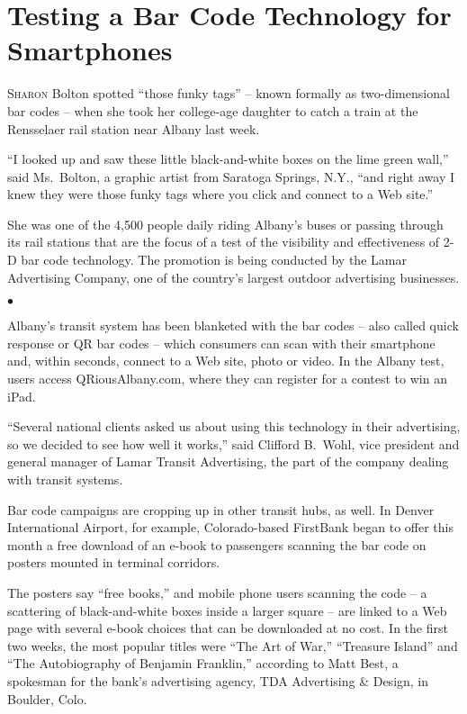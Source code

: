 ﻿\documentclass[12pt]{article}
\begin{document}
\section{Testing a Bar Code Technology for Smartphones}

\lettrine{S}{haron} Bolton spotted ``those funky tags'' -- known formally as
two-dimensional bar codes -- when she took her college-age daughter to catch a train at the
Rensselaer rail station near Albany last week.

``I looked up and saw these little black-and-white boxes on the lime green wall,'' said Ms.~Bolton,
a graphic artist from Saratoga Springs, N.Y., ``and right away I knew they were those funky tags
where you click and connect to a Web site.''

She was one of the 4,500 people daily riding Albany's buses or passing through its rail stations
that are the focus of a test of the visibility and effectiveness of 2-D bar code technology. The
promotion is being conducted by the Lamar Advertising Company, one of the country's largest outdoor
advertising businesses.

$\bullet$

Albany's transit system has been blanketed with the bar codes -- also called quick response or QR
bar codes -- which consumers can scan with their smartphone and, within seconds, connect to a Web
site, photo or video. In the Albany test, users access QRiousAlbany.com, where they can register for
a contest to win an iPad.

``Several national clients asked us about using this technology in their advertising, so we decided
to see how well it works,'' said Clifford B.~Wohl, vice president and general manager of Lamar
Transit Advertising, the part of the company dealing with transit systems.

Bar code campaigns are cropping up in other transit hubs, as well. In Denver International Airport,
for example, Colorado-based FirstBank began to offer this month a free download of an e-book to
passengers scanning the bar code on posters mounted in terminal corridors.

The posters say ``free books,'' and mobile phone users scanning the code -- a scattering of
black-and-white boxes inside a larger square -- are linked to a Web page with several e-book choices
that can be downloaded at no cost. In the first two weeks, the most popular titles were ``The Art of
War,'' ``Treasure Island'' and ``The Autobiography of Benjamin Franklin,'' according to Matt Best, a
spokesman for the bank's advertising agency, TDA Advertising \& Design, in Boulder, Colo.
\end{document}
